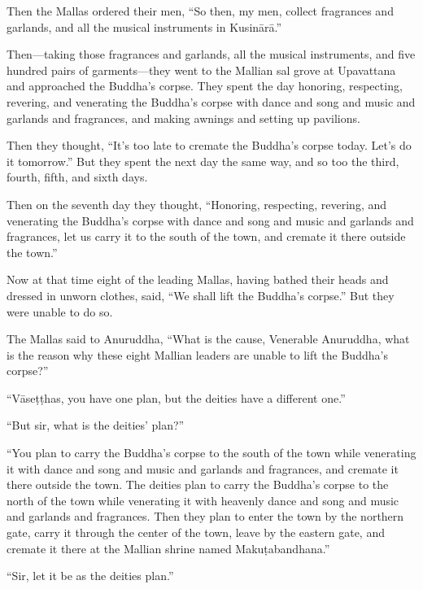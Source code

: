 \documentclass[12pt,openany]{book}%
\begin{document}
Then the Mallas ordered their men, “So then, my men, collect fragrances and garlands, and all the musical instruments in \textsanskrit{Kusinārā}.” 

Then—taking those fragrances and garlands, all the musical instruments, and five hundred pairs of garments—they went to the Mallian sal grove at Upavattana and approached the Buddha’s corpse. They spent the day honoring, respecting, revering, and venerating the Buddha’s corpse with dance and song and music and garlands and fragrances, and making awnings and setting up pavilions. 

Then they thought, “It’s too late to cremate the Buddha’s corpse today. Let’s do it tomorrow.” But they spent the next day the same way, and so too the third, fourth, fifth, and sixth days. 

Then on the seventh day they thought, “Honoring, respecting, revering, and venerating the Buddha’s corpse with dance and song and music and garlands and fragrances, let us carry it to the south of the town, and cremate it there outside the town.” 

Now at that time eight of the leading Mallas, having bathed their heads and dressed in unworn clothes, said, “We shall lift the Buddha’s corpse.” But they were unable to do so. 

The Mallas said to Anuruddha, “What is the cause, Venerable Anuruddha, what is the reason why these eight Mallian leaders are unable to lift the Buddha’s corpse?” 

“\textsanskrit{Vāseṭṭhas}, you have one plan, but the deities have a different one.” 

“But sir, what is the deities’ plan?” 

“You plan to carry the Buddha’s corpse to the south of the town while venerating it with dance and song and music and garlands and fragrances, and cremate it there outside the town. The deities plan to carry the Buddha’s corpse to the north of the town while venerating it with heavenly dance and song and music and garlands and fragrances. Then they plan to enter the town by the northern gate, carry it through the center of the town, leave by the eastern gate, and cremate it there at the Mallian shrine named \textsanskrit{Makuṭabandhana}.” 

“Sir, let it be as the deities plan.” 
\end{document}
